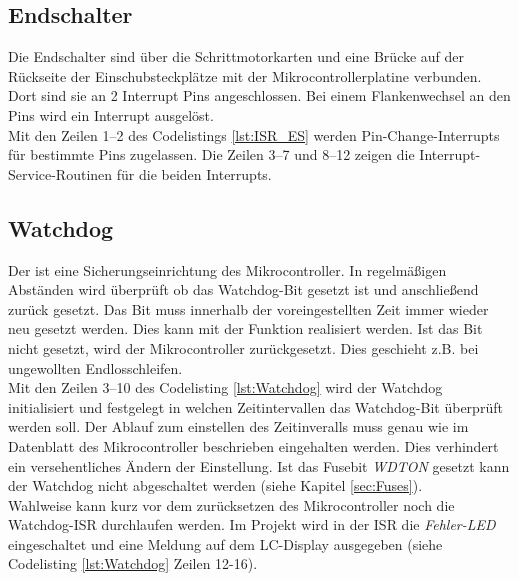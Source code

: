 \subsection{Endschalter}
\label{sec:Endschalter_SW}
Die Endschalter sind über die Schrittmotorkarten und eine Brücke auf der Rückseite der Einschubsteckplätze mit der Mikrocontrollerplatine verbunden. Dort sind sie an 2 Interrupt Pins angeschlossen.  Bei einem Flankenwechsel an den Pins wird ein Interrupt ausgelöst. \\
Mit den Zeilen 1--2 des Codelistings \ref{lst:ISR_ES} werden Pin-Change-Interrupts für bestimmte Pins zugelassen. Die Zeilen 3--7 und 8--12 zeigen die Interrupt-Service-Routinen für die beiden Interrupts.
\lstset{language=C, basicstyle=\footnotesize, showstringspaces=false, tabsize=2}

\subsection{Watchdog}
Der  ist eine Sicherungseinrichtung des Mikrocontroller. In regelmäßigen Abständen wird überprüft ob das Watchdog-Bit gesetzt ist und anschließend zurück gesetzt. Das Bit muss innerhalb der voreingestellten Zeit immer wieder neu gesetzt werden. Dies kann mit der Funktion  realisiert werden. Ist das Bit nicht gesetzt, wird der Mikrocontroller zurückgesetzt. Dies geschieht z.B. bei ungewollten Endlosschleifen.\\
Mit den Zeilen 3--10 des Codelisting \ref{lst:Watchdog} wird der Watchdog initialisiert und festgelegt in welchen Zeitintervallen das Watchdog-Bit überprüft werden soll. Der Ablauf zum einstellen des Zeitinveralls muss genau wie im Datenblatt des Mikrocontroller beschrieben eingehalten werden. Dies verhindert ein versehentliches Ändern der Einstellung. 
Ist das Fusebit \emph{WDTON} gesetzt kann der Watchdog nicht abgeschaltet werden (siehe Kapitel \ref{sec:Fuses}).\\
Wahlweise kann kurz vor dem zurücksetzen des Mikrocontroller noch die Watchdog-ISR durchlaufen werden. Im Projekt wird in der ISR die \emph{Fehler-LED} eingeschaltet und eine Meldung auf dem LC-Display ausgegeben (siehe Codelisting \ref{lst:Watchdog} Zeilen 12-16).
\lstset{language=C, basicstyle=\footnotesize, showstringspaces=false, tabsize=4}


